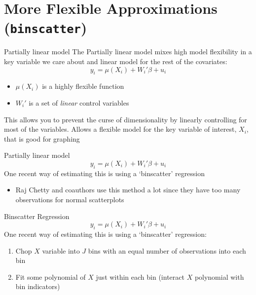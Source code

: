 \documentclass[aspectratio=169,t,11pt,table]{beamer}
\begin{document}
\section{More Flexible Approximations (\texttt{binscatter})}

\begin{frame}{Partially linear model}
  The \alert{Partially linear model} mixes high model flexibility in a key variable we care about and linear model for the rest of the covariates:
  $$
    y_i = \mu(X_i) + W_i' \beta + u_i
  $$
  \begin{itemize}
    \item $\mu(X_i)$ is a highly flexible function
    \item $W_i'$ is a set of \emph{linear} control variables
  \end{itemize}

  \bigskip
  This allows you to prevent the curse of dimensionality by linearly controlling for most of the variables. Allows a flexible model for the key variable of interest, $X_i$, that is good for graphing
\end{frame}

\begin{frame}{Partially linear model}
  $$
    y_i = \mu(X_i) + W_i' \beta + u_i
  $$
  One recent way of estimating this is using a `binscatter' regression 
  \begin{itemize}
    \item Raj Chetty and coauthors use this method a lot since they have too many observations for normal scatterplots
  \end{itemize}
\end{frame}

\begin{frame}{Binscatter Regression}
  $$
    y_i = \mu(X_i) + W_i' \beta + u_i
  $$
  One recent way of estimating this is using a `binscatter' regression:
  \begin{enumerate}
    \item Chop $X$ variable into $J$ bins with an equal number of observations into each bin
    
    \item Fit some polynomial of $X$ just within each bin (interact $X$ polynomial with bin indicators)
  \end{enumerate}
\end{frame}



\end{document}
